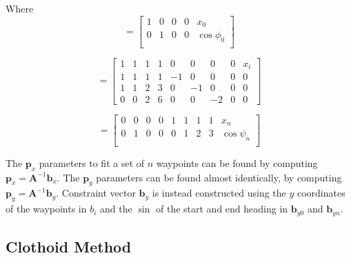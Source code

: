 Where
\begin{equation}
[\bm{A}_{0}|\bm{b}_{x0}] = \left[ \begin{array}{cccc|c}
1 & 0 & 0 & 0 & x_0\\
0 & 1 & 0 & 0 & \cos{\phi_0}\\
\end{array} \right] 
\label{eq:submatrix_0}
\end{equation}

\begin{equation}
[\bm{A}_{i}|\bm{b}_{xi}] = \left[\begin{array}{cccccccc|c}
1 & 1 & 1 & 1 & 0 & 0 & 0 & 0 & x_{i}\\
1 & 1 & 1 & 1 & -1 & 0 & 0 & 0 & 0\\
1 & 1 & 2 & 3 & 0 & -1 & 0 & 0 & 0\\
0 & 0 & 2 & 6 & 0 & 0 & -2 & 0 & 0
\end{array}\right]
\label{eq:submatrix_i}
\end{equation}

\begin{equation}
[\bm{A}_{n}|\bm{b}_{xn}] = \left[\begin{array}{cccccccc|c}
0 & 0 & 0 & 0 & 1 & 1 & 1 & 1 &x_n\\
0 & 1 & 0 & 0 & 0 & 1 & 2 & 3 & \cos{\psi_n}\\
\end{array}\right] 
\label{eq:submatrix_n}
\end{equation}

The $\bm{p}_x$ parameters to fit a set of $n$ waypoints can be found by computing $\bm{p}_x = \bm{A}^{-1}\bm{b}_x$. The $\bm{p}_y$ parameters can be found almost identically, by computing $\bm{p}_y=\bm{A}^{-1}\bm{b}_y$. Constraint vector $\bm{b}_y$ is instead constructed using the $y$ coordinates of the waypoints in $b_i$ and the $\sin$ of the start and end heading in $\bm{b}_{y0}$ and $\bm{b}_{yn}$.



\subsection{Clothoid Method}
